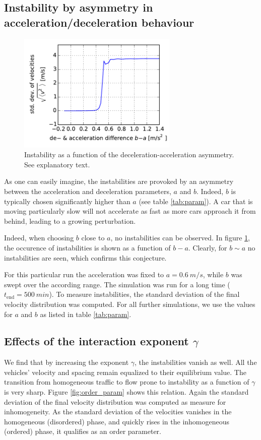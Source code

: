\subsection{Instability by asymmetry in acceleration/deceleration behaviour}

\begin{figure}
    \centering
    \includegraphics[width=3in]{../img/order_parameter_delta_acceleration.pdf}
    \caption{Instability as a function of the deceleration-acceleration asymmetry. See explanatory text.}
    \label{fig:order_parameter_delta_acceleration}
\end{figure}
As one can easily imagine, the instabilities are provoked by an asymmetry between the acceleration and deceleration parameters, $a$ and $b$. Indeed, $b$ is typically chosen significantly higher than $a$ (see table \ref{tab:param}). A car that is moving particularly slow will not accelerate as fast as more cars approach it from behind, leading to a growing perturbation.

Indeed, when choosing $b$ close to $a$, no instabilities can be observed. In figure \ref{fig:order_parameter_delta_acceleration}, the occurence of instabilities is shown as a function of $b-a$. Clearly, for $b\sim a$ no instabilities are seen, which confirms this conjecture.

 For this particular run the acceleration was fixed to $a=\SI{0.6}{m/s}$, while $b$ was swept over the according range. The simulation was run for a long time ($t_\mathrm{end} = \SI{500}{min}$). To measure instabilities, the standard deviation of the final velocity distribution was computed. For all further simulations, we use the values for $a$ and $b$ as listed in table \ref{tab:param}.

\subsection{Effects of the interaction exponent $\gamma$}
We find that by increasing the exponent $\gamma$, the instabilities vanish as well. All the vehicles' velocity and spacing remain equalized to their equilibrium value. The transition from homogeneous traffic to flow prone to instability as a function of $\gamma$ is very sharp. Figure \ref{fig:order_param} shows this relation. Again the standard deviation of the final velocity distribution was computed as measure for inhomogeneity. As the standard deviation of the velocities vanishes in the homogeneous (disordered) phase, and quickly rises in the inhomogeneous (ordered) phase, it qualifies as an order parameter.

